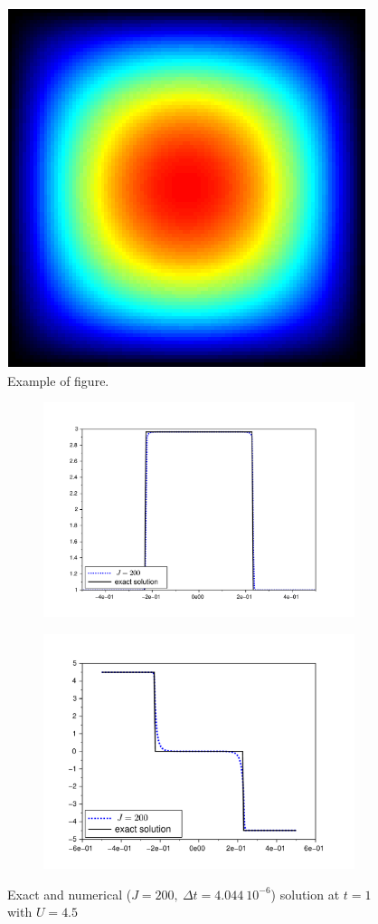 \documentclass[a4paper]
{cedram-smai-jcm}
\begin{document}
\begin{figure}[!htbp]
\includegraphics[width=0.3\linewidth]{figure-msia.pdf}
\caption{Example of figure.}
\label{F1}
\end{figure}


\begin{figure}[!htbp]
  \centering
  \begin{subfigure}[b]{0.45\textwidth}
    \includegraphics[clip,trim=64 40 90 60,scale=0.34]{./Density_Rhos3J200Dt4044e-9}
  \end{subfigure}
  \quad
  \begin{subfigure}[b]{0.45\textwidth}
    \includegraphics[clip,trim=45 30 60 50,scale=0.4]{./Velocity_Rhos3J200Dt4044e-9}
  \end{subfigure}
  \caption{Exact and numerical ($J=200,\ \Delta t=4.044\ 10^{-6}$) solution
  at $t=1$ with $U = 4.5$}
\label{F2}
\end{figure}
\end{document}
